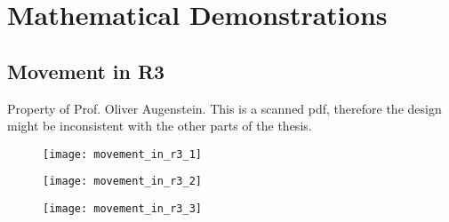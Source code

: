 \section{Mathematical Demonstrations} 
\subsection{Movement in R3} \label{movement-in-r3}

Property of Prof. Oliver Augenstein. This is a scanned pdf, therefore the design might be inconsistent with the other parts of the thesis.

\begin{figure}[h!]
	\centering
	\texttt{[image: movement\_in\_r3\_1]}
\end{figure}
\newpage
\begin{figure}[h!]
	\centering
	\texttt{[image: movement\_in\_r3\_2]}
\end{figure}
\newpage
\begin{figure}[h!]
	\centering
	\texttt{[image: movement\_in\_r3\_3]}
\end{figure}
